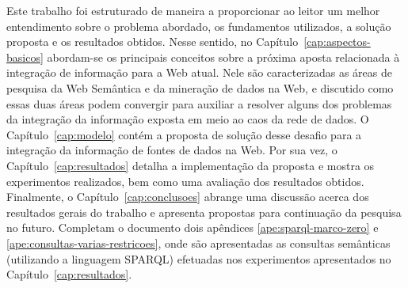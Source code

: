 Este trabalho foi estruturado de maneira a proporcionar ao leitor um melhor entendimento sobre o problema abordado, os fundamentos utilizados, a solução proposta e  os resultados obtidos. Nesse sentido, no Capítulo~\ref{cap:aspectos-basicos} abordam-se os principais conceitos sobre a próxima aposta relacionada à integração de informação para a Web atual. Nele são caracterizadas as áreas de pesquisa da Web Semântica e da mineração de dados na Web, e discutido como essas duas áreas podem convergir para auxiliar a resolver alguns dos problemas da integração da informação exposta em meio ao caos da rede de dados. O Capítulo~\ref{cap:modelo} contém a proposta de solução desse desafio para a integração da informação de fontes de dados na Web. Por sua vez, o Capítulo~\ref{cap:resultados} detalha a implementação da proposta e mostra os experimentos realizados, bem como uma avaliação dos resultados obtidos. Finalmente, o Capítulo~\ref{cap:conclusoes} abrange uma discussão acerca dos resultados gerais do trabalho e apresenta propostas para continuação da pesquisa no futuro. Completam o documento dois apêndices \ref{ape:sparql-marco-zero} e \ref{ape:consultas-varias-restricoes}, onde são apresentadas as consultas semânticas (utilizando a linguagem SPARQL) efetuadas nos experimentos apresentados no Capítulo~\ref{cap:resultados}.











































































